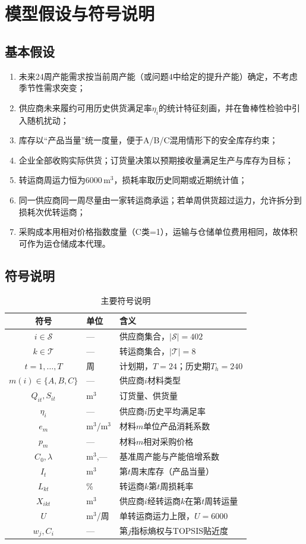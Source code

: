 \documentclass[12pt,a4paper]{ctexart}
\begin{document}
\section{模型假设与符号说明}

\subsection{基本假设}
\begin{enumerate}[leftmargin=2em,itemsep=0.2em]
\item 未来24周产能需求按当前周产能（或问题4中给定的提升产能）确定，不考虑季节性需求突变；
\item 供应商未来履约可用历史供货满足率$\eta_i$的统计特征刻画，并在鲁棒性检验中引入随机扰动；
\item 库存以“产品当量”统一度量，便于A/B/C混用情形下的安全库存约束；
\item 企业全部收购实际供货；订货量决策以预期接收量满足生产与库存为目标；
\item 转运商周运力恒为6000\,m$^3$，损耗率取历史同期或近期统计值；
\item 同一供应商同一周尽量由一家转运商承运；若单周供货超过运力，允许拆分到损耗次优转运商；
\item 采购成本用相对价格指数度量（C类=1），运输与仓储单位费用相同，故体积可作为运仓储成本代理。
\end{enumerate}

\subsection{符号说明}
\begin{table}[H]
\centering
\caption{主要符号说明}
\label{tab:symbol}
\begin{tabular}{clp{7.2cm}}
\toprule
符号 & 单位 & 含义 \\
\midrule
$i\in\mathcal{S}$ & — & 供应商集合，$\lvert\mathcal{S}\rvert=402$ \\
$k\in\mathcal{T}$ & — & 转运商集合，$\lvert\mathcal{T}\rvert=8$ \\
$t=1,\ldots,T$ & 周 & 计划期，$T=24$；历史期$T_h=240$ \\
$m(i)\in\{A,B,C\}$ & — & 供应商$i$材料类型 \\
$Q_{it},S_{it}$ & m$^3$ & 订货量、供货量 \\
$\eta_i$ & — & 供应商$i$历史平均满足率 \\
$e_m$ & m$^3$/m$^3$ & 材料$m$单位产品消耗系数 \\
$p_m$ & — & 材料$m$相对采购价格 \\
$C_0,\lambda$ & m$^3$,— & 基准周产能与产能倍增系数 \\
$I_t$ & m$^3$ & 第$t$周末库存（产品当量） \\
$L_{kt}$ & \% & 转运商$k$第$t$周损耗率 \\
$X_{ikt}$ & m$^3$ & 供应商$i$经转运商$k$在第$t$周转运量 \\
$U$ & m$^3$/周 & 单转运商运力上限，$U=6000$ \\
$w_j,C_i$ & — & 第$j$指标熵权与TOPSIS贴近度 \\
\bottomrule
\end{tabular}
\end{table}
\end{document}
